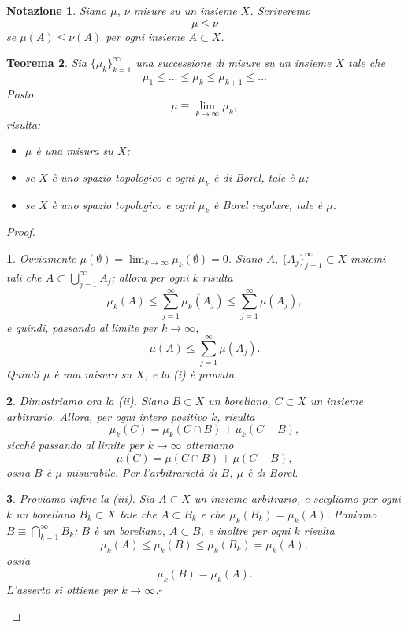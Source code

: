 \documentclass[a4paper,10pt,openright,oneside]{book}
\theoremstyle{theoremstyle}
\newtheorem{teorema}{Teorema}[section]
\theoremstyle{theoremstylewoheader}
\theoremstyle{theoremstyle}
\newtheorem{notazione}[teorema]{Notazione}
\theoremstyle{proofsecstyle}
\newtheorem{proofsec}{}
\theoremstyle{nonumberplain}
\newtheorem{proof}{Dim.}
\renewcommand{\qedsymbol}{\ensuremath{\square}}
\newcommand{\qed}{\unskip\nobreak\hfill\nobreak\hspace{.5em}\qedsymbol}
\begin{document}
\begin{notazione}
Siano $\mu$, $\nu$ misure su un insieme $X$. Scriveremo
\[
\mu \le \nu
\]
se $\mu(A) \le \nu(A)$ per ogni insieme $A \subset X$.
\end{notazione}

\begin{teorema}
\label{thm:limite_di_misure}
Sia $\{\mu_k\}_{k=1}^\infty$ una successione di misure su un insieme $X$ tale che
\[
\mu_1 \le \ldots \le \mu_k \le \mu_{k+1} \le \ldots
\]
Posto
\[
\mu \equiv \lim_{k \to \infty} \mu_k,
\]
risulta:
\begin{itemize}
\item[(i)] $\mu$ è una misura su $X$;
\item[(ii)] se $X$ è uno spazio topologico e ogni $\mu_k$ è di Borel, tale è $\mu$;
\item[(iii)] se $X$ è uno spazio topologico e ogni $\mu_k$ è Borel regolare, tale è $\mu$.
\end{itemize}
\end{teorema}

\begin{proof}
\begin{proofsec}
Ovviamente $\mu(\emptyset) = \lim_{k \to \infty} \mu_k(\emptyset) = 0$. Siano $A,\, \{A_j\}_{j=1}^\infty \subset X$ insiemi tali che $A \subset \bigcup_{j=1}^\infty A_j$; allora per ogni $k$ risulta 
\[
\mu_k(A) \le \sum_{j=1}^\infty \mu_k(A_j) \le \sum_{j=1}^\infty \mu(A_j),
\]
e quindi, passando al limite per $k \to \infty$,
\[
\mu(A) \le \sum_{j=1}^\infty \mu(A_j).
\]
Quindi $\mu$ è una misura su $X$, e la (i) è provata. 
\end{proofsec}

\begin{proofsec}
Dimostriamo ora la (ii). Siano $B \subset X$ un boreliano, $C \subset X$ un insieme arbitrario. Allora, per ogni intero positivo $k$, risulta
\[
\mu_k(C) = \mu_k(C \cap B) + \mu_k(C - B),
\]
sicché passando al limite per $k \to \infty$ otteniamo
\[
\mu(C) = \mu(C \cap B) + \mu(C - B),
\]
ossia $B$ è $\mu$-misurabile. Per l'arbitrarietà di $B$, $\mu$ è di Borel.
\end{proofsec}

\begin{proofsec}
Proviamo infine la (iii). Sia $A \subset X$ un insieme arbitrario, e scegliamo per ogni $k$ un boreliano $B_k \subset X$ tale che $A \subset B_k$ e che $\mu_k(B_k) = \mu_k(A)$. Poniamo $B \equiv \bigcap_{k=1}^\infty B_k$; $B$ è un boreliano, $A \subset B$, e inoltre per ogni $k$ risulta 
\[
\mu_k(A) \le \mu_k(B) \le \mu_k(B_k) = \mu_k(A),
\]
ossia
\[
\mu_k(B) = \mu_k(A).
\]
L'asserto si ottiene per $k \to \infty$.\qed
\end{proofsec}
\end{proof}
\end{document}
